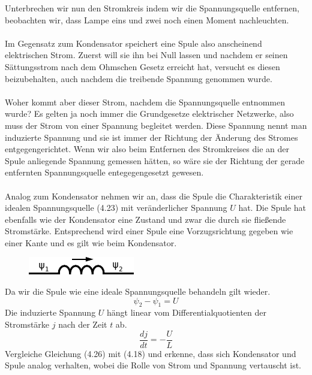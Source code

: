 \documentclass[11pt,a4paper,leqno]{report}
\numberwithin{equation}{chapter}
\begin{document}
Unterbrechen wir nun den Stromkreis indem wir die Spannungsquelle entfernen, beobachten wir, dass Lampe eins und zwei noch einen Moment nachleuchten.\\
\\
Im Gegensatz zum Kondensator speichert eine Spule also anscheinend elektrischen Strom. Zuerst will sie ihn bei Null lassen und nachdem er seinen S\"attungsstrom nach dem Ohmschen Gesetz erreicht hat, versucht es diesen beizubehalten, auch nachdem die treibende Spannung genommen wurde.
\\
\\
Woher kommt aber dieser Strom, nachdem die Spannungsquelle entnommen wurde? Es gelten ja noch immer die Grundgesetze elektrischer Netzwerke, also muss der Strom von einer Spannung begleitet werden. Diese Spannung nennt man induzierte Spannung und sie ist immer der Richtung der \"Anderung des Stromes entgegengerichtet. Wenn wir also beim Entfernen des Stromkreises die an der Spule anliegende Spannung gemessen h\"atten, so w\"are sie der Richtung der gerade entfernten Spannungsquelle entegegengesetzt gewesen.\\
\\
Analog zum Kondensator nehmen wir an, dass die Spule die Charakteristik einer idealen Spannungsquelle (4.23) mit ver\"anderlicher Spannung $U$ hat. Die Spule hat ebenfalls wie der Kondensator eine Zustand und zwar die durch sie flie\ss{}ende Stromst\"arke.
Entsprechend wird einer Spule eine Vorzugsrichtung gegeben wie einer Kante und es gilt wie beim Kondensator.
  \begin{figure}[H]
	\begin{center}
		\includegraphics[scale=1.5]{spule_direkt.pdf}
	\end{center}
\end{figure}
\noindent
Da wir die Spule wie eine ideale Spannungsquelle behandeln gilt wieder.
\begin{equation*}
\psi_2 - \psi_1 = U
\end{equation*}
Die induzierte Spannung $U$ h\"angt linear vom Differentialquotienten der Stromst\"arke $j$ nach der Zeit $t$ ab.
 \begin{equation}
\frac{dj}{dt} = -\frac{U}{L} 
\end{equation}
\noindent
Vergleiche Gleichung (4.26) mit (4.18) und erkenne, dass sich Kondensator und Spule analog verhalten, wobei die Rolle von Strom und Spannung vertauscht ist.\\
\end{document}
